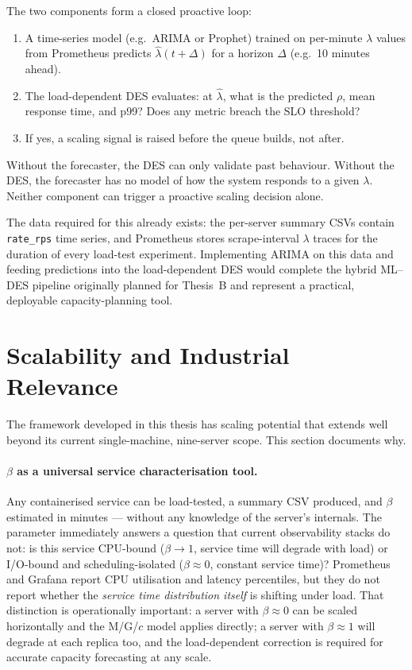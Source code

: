 The two components form a closed proactive loop:
\begin{enumerate}
    \item A time-series model (e.g.\ ARIMA or Prophet) trained on per-minute $\lambda$ values from Prometheus predicts $\hat{\lambda}(t + \Delta)$ for a horizon $\Delta$ (e.g.\ 10 minutes ahead).
    \item The load-dependent DES evaluates: at $\hat{\lambda}$, what is the predicted $\rho$, mean response time, and p99? Does any metric breach the SLO threshold?
    \item If yes, a scaling signal is raised before the queue builds, not after.
\end{enumerate}

Without the forecaster, the DES can only validate past behaviour. Without the DES, the forecaster has no model of how the system responds to a given $\lambda$. Neither component can trigger a proactive scaling decision alone.

The data required for this already exists: the per-server summary CSVs contain \texttt{rate\_rps} time series, and Prometheus stores scrape-interval $\lambda$ traces for the duration of every load-test experiment. Implementing ARIMA on this data and feeding predictions into the load-dependent DES would complete the hybrid ML--DES pipeline originally planned for Thesis~B and represent a practical, deployable capacity-planning tool.

\section{Scalability and Industrial Relevance}
\label{sec:scalability}

The framework developed in this thesis has scaling potential that extends well beyond its current single-machine, nine-server scope. This section documents why.

\paragraph{$\beta$ as a universal service characterisation tool.}
Any containerised service can be load-tested, a summary CSV produced, and $\beta$ estimated in minutes — without any knowledge of the server's internals. The parameter immediately answers a question that current observability stacks do not: is this service CPU-bound ($\beta \to 1$, service time will degrade with load) or I/O-bound and scheduling-isolated ($\beta \approx 0$, constant service time)? Prometheus and Grafana report CPU utilisation and latency percentiles, but they do not report whether the \emph{service time distribution itself} is shifting under load. That distinction is operationally important: a server with $\beta \approx 0$ can be scaled horizontally and the M/G/$c$ model applies directly; a server with $\beta \approx 1$ will degrade at each replica too, and the load-dependent correction is required for accurate capacity forecasting at any scale.


